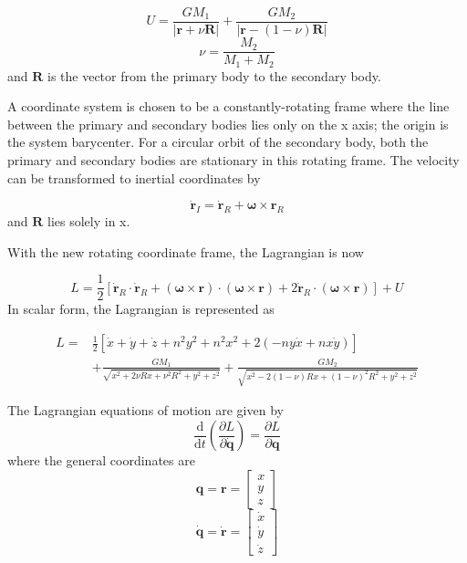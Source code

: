 \documentclass[]{aiaa-tc}%
\begin{document}
\begin{equation}
U=\frac{GM_1}{\left | \mathbf{r}+\nu \boldsymbol{\mathbf{R}} \right |} + \frac{GM_2}{\left | \mathbf{r}-\left (1-\nu  \right ) \boldsymbol{\mathbf{R}} \right |}
\end{equation}
\begin{equation}
\nu=\frac{M_2}{M_1+M_2}
\end{equation}
and $\mathbf{R}$ is the vector from the primary body to the secondary body. 

A coordinate system is chosen to be a constantly-rotating frame where the line between the primary and secondary bodies lies only on the x axis; the origin is the system barycenter. For a circular orbit of the secondary body, both the primary and secondary bodies are stationary in this rotating frame. The velocity can be transformed to inertial coordinates by

\begin{equation}
\mathbf{\dot{r}}_{I}=\mathbf{\dot{r}}_{R}+\boldsymbol{\omega}\times \mathbf{r}_{R} 
\end{equation}
and $\mathbf{R}$ lies solely in x.

With the new rotating coordinate frame, the Lagrangian is now

\begin{equation}
L=\frac{1}{2}\left [ \mathbf{\dot{r}}_R\cdot \mathbf{\dot{r}}_R + \left ( \boldsymbol{\omega} \times \mathbf{r} \right ) \cdot \left ( \boldsymbol{\omega} \times \mathbf{r} \right ) +2\mathbf{\dot{r}}_R \cdot \left (  \boldsymbol{\omega} \times \mathbf{r} \right )\right ] +U
\end{equation}
In scalar form, the Lagrangian is represented as

\begin{equation}
\begin{aligned} 
L=&\frac{1}{2}\left [ \dot{x}+\dot{y}+\dot{z}+ n^2y^2+n^2x^2 +2(-ny\dot{x}+nx\dot{y})\right ]\\&+\frac{GM_1}{\sqrt{x^2+2\nu Rx+\nu^2R^2+y^2+z^2}} + \frac{GM_2}{\sqrt{x^2-2(1-\nu) Rx+(1-\nu)^2R^2+y^2+z^2}}
\end{aligned}
\end{equation}


The Lagrangian equations of motion are given by 
\begin{equation}
\frac{\mathrm{d} }{\mathrm{d} t}\left ( \frac{\partial L}{\partial \mathbf{\dot{q}}} \right ) = \frac{\partial L}{\partial \mathbf{q}}
\end{equation}
where the general coordinates are
\begin{equation}
\mathbf{q}=\mathbf{r}=
\begin{bmatrix}
x\\y\\z
\end{bmatrix}
\end{equation}
\begin{equation}
\mathbf{\dot{q}}=\mathbf{\dot{r}}=
\begin{bmatrix}
\dot{x}\\
\dot{y}\\
\dot{z}
\end{bmatrix}
\end{equation}
\end{document}

